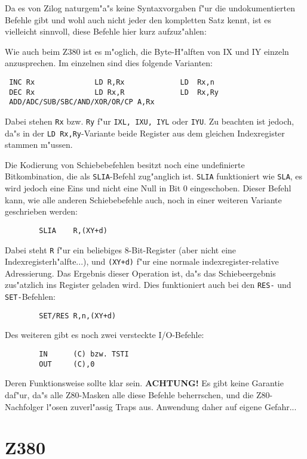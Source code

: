 \documentclass[12pt,a4paper,twoside]{report}
\newcommand{\bb}[1]{{\bf #1}}
\newcommand{\tty}[1]{{\tt #1}}
\begin{document}
{Da es von Zilog naturgem"a"s keine Syntaxvorgaben f"ur die undokumentierten
Befehle gibt und wohl auch nicht jeder den kompletten Satz kennt,
ist es vielleicht sinnvoll, diese Befehle hier kurz aufzuz"ahlen:
\par
Wie auch beim Z380 ist es m"oglich, die Byte-H"alften von IX und IY
einzeln anzusprechen.  Im einzelnen sind dies folgende Varianten:
\begin{verbatim}
 INC Rx              LD R,Rx             LD  Rx,n
 DEC Rx              LD Rx,R             LD  Rx,Ry
 ADD/ADC/SUB/SBC/AND/XOR/OR/CP A,Rx
\end{verbatim}
Dabei stehen \tty{Rx} bzw. \tty{Ry} f"ur \tty{IXL, IXU, IYL} oder
\tty{IYU}.  Zu beachten ist jedoch, da"s in der \tty{LD Rx,Ry}-Variante
beide Register aus dem gleichen Indexregister stammen m"ussen.
\par
Die Kodierung von Schiebebefehlen besitzt noch eine undefinierte
Bitkombination, die als \tty{SLIA}-Befehl zug"anglich ist.  \tty{SLIA}
funktioniert wie \tty{SLA}, es wird jedoch eine Eins und nicht eine Null
in Bit 0 eingeschoben.  Dieser Befehl kann, wie alle anderen
Schiebebefehle auch, noch in einer weiteren Variante geschrieben
werden:
\begin{verbatim}
        SLIA    R,(XY+d)
\end{verbatim}
Dabei steht \tty{R} f"ur ein beliebiges 8-Bit-Register (aber nicht eine
Indexregisterh"alfte...), und \tty{(XY+d)} f"ur eine normale
indexregister-relative Adressierung.  Das Ergebnis dieser Operation
ist, da"s das Schiebeergebnis zus"atzlich ins Register geladen wird.
Dies funktioniert auch bei den \tty{RES-} und \tty{SET-}Befehlen:
\begin{verbatim}
        SET/RES R,n,(XY+d)
\end{verbatim}
Des weiteren gibt es noch zwei versteckte I/O-Befehle:
\begin{verbatim}
        IN      (C) bzw. TSTI
        OUT     (C),0
\end{verbatim}
Deren Funktionsweise sollte klar sein.  \bb{ACHTUNG!} Es gibt keine
Garantie daf"ur, da"s alle Z80-Masken alle diese Befehle beherrschen,
und die Z80-Nachfolger l"osen zuverl"assig Traps aus.  Anwendung
daher auf eigene Gefahr...


\section{Z380}

}
\end{document}
